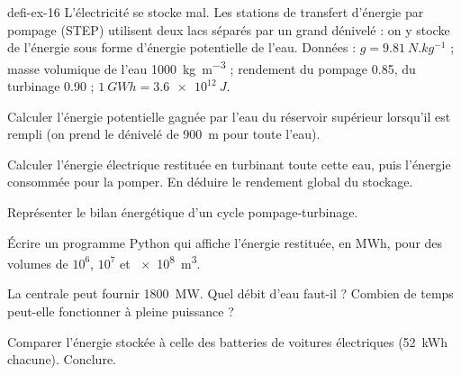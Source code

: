 \begin{blocEdition}{defi-ex-16}
L'électricité se stocke mal. Les stations de transfert d'énergie par pompage (STEP) utilisent deux lacs séparés par un grand
dénivelé : on y stocke de l'énergie sous forme d'énergie potentielle de l'eau.
Données : $g=\qty{9,81}{N.kg^{-1}}$ ; masse volumique de l'eau \qty{1000}{kg.m^{-3}} ; rendement du pompage \num{0,85}, du turbinage \num{0,90} ; $\qty{1}{GWh}=\qty{3,6e12}{J}$.
\begin{questions}
\item Calculer l'énergie potentielle gagnée par l'eau du réservoir supérieur lorsqu'il est rempli (on prend le dénivelé de \qty{900}{m} pour toute l'eau).
\item Calculer l'énergie électrique restituée en turbinant toute cette eau, puis l'énergie consommée pour la pomper. En déduire le
rendement global du stockage.
\item Représenter le bilan énergétique d'un cycle pompage-turbinage.
\item Écrire un programme Python qui affiche l'énergie restituée, en MWh, pour des volumes de $10^6$, $10^7$ et \qty{e8}{m^3}.
\item La centrale peut fournir \qty{1800}{MW}. Quel débit d'eau faut-il ? Combien de temps peut-elle fonctionner à pleine puissance ?
\item Comparer l'énergie stockée à celle des batteries de voitures électriques (\qty{52}{kWh} chacune). Conclure.
\end{questions}
\end{blocEdition}

